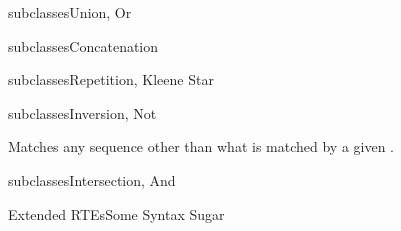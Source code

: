 \newsavebox\orbox
\begin{lrbox}{\orbox}
  \begin{minipage}{12cm}
    
  \end{minipage}
\end{lrbox}

\newsavebox\andbox
\begin{lrbox}{\andbox}
  \begin{minipage}{12cm}
    
  \end{minipage}
\end{lrbox}


\begin{frame}{ subclasses}{Union, Or}
  \usebox\orbox
 \end{frame}




\newsavebox\catbox
\begin{lrbox}{\catbox}
  \begin{minipage}{12cm}
    
  \end{minipage}
\end{lrbox}


\begin{frame}{ subclasses}{Concatenation}
  \usebox\catbox
 \end{frame}



\newsavebox\starbox
\begin{lrbox}{\starbox}
  \begin{minipage}{12cm}
    
  \end{minipage}
\end{lrbox}

\newsavebox\notbox
\begin{lrbox}{\notbox}
  \begin{minipage}{12cm}
    
  \end{minipage}
\end{lrbox}


\begin{frame}{ subclasses}{Repetition, Kleene Star}
  \usebox\starbox
\end{frame}

\begin{frame}{ subclasses}{Inversion, Not}
  \usebox\notbox

  Matches any sequence other than what is matched by a given .
\end{frame}

\begin{frame}{ subclasses}{Intersection, And}
  \usebox\andbox
 \end{frame}


\newsavebox\extendedbox
\begin{lrbox}{\extendedbox}
  \begin{minipage}{12cm}
  
  \end{minipage}
\end{lrbox}

\begin{frame}{Extended RTEs}{Some Syntax Sugar}
  \usebox\extendedbox
\end{frame}





